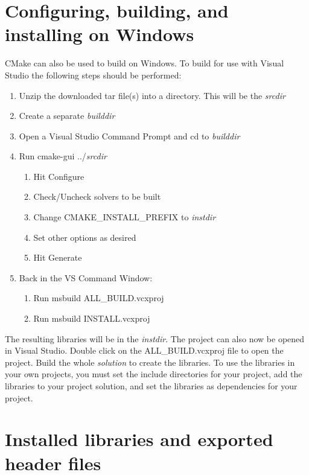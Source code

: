 \section{Configuring, building, and installing  on Windows}\label{s:cmake_windows}
CMake can also be used to build {\sundials} on Windows. To build {\sundials} for
use with Visual Studio the following steps should be performed:
\begin{enumerate}
\item Unzip the downloaded tar file(s) into a directory. This will be the {\em srcdir} 
\item Create a separate {\em builddir}
\item Open a Visual Studio Command Prompt and cd to {\em builddir}
\item Run cmake-gui ../{\em srcdir}
\begin{enumerate}
\item Hit Configure
\item Check/Uncheck solvers to be built
\item Change CMAKE\_INSTALL\_PREFIX to {\em instdir}
\item Set other options as desired
\item Hit Generate
\end{enumerate}
\item Back in the VS Command Window:
\begin{enumerate}
\item Run msbuild ALL\_BUILD.vcxproj
\item Run msbuild INSTALL.vcxproj
\end{enumerate} 
\end{enumerate}

\noindent The resulting libraries will be in the {\em instdir}.
\noindent The {\sundials} project can also now be opened in Visual Studio.
Double click on the ALL\_BUILD.vcxproj file to open the project.
Build the whole {\em solution} to create the {\sundials} libraries.
To use the {\sundials} libraries in your own projects, you must
set the include directories for your project,
add the {\sundials} libraries to your project solution,
and set the {\sundials} libraries as dependencies for your project.

\section{Installed libraries and exported header files}

